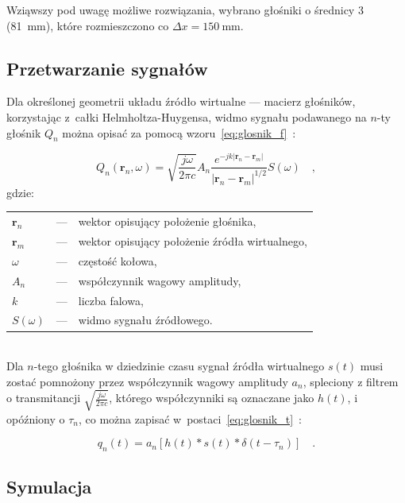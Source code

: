 \documentclass[12pt]{oska}
\let\Oldsubsection\subsection
\renewcommand{\subsection}{\FloatBarrier\Oldsubsection}
\begin{document}
Wziąwszy pod uwagę możliwe rozwiązania, wybrano głośniki o średnicy \SI{3}{\inch}
(\SI{81}{\milli\meter}), które rozmieszczono co
$\Delta x=\SI{150}{\milli\meter}$.

\subsection{Przetwarzanie sygnałów}\label{s:algorithm}

Dla określonej geometrii układu źródło wirtualne --- macierz głośników,
korzystając z~całki Helmholtza-Huygensa, widmo sygnału podawanego na $n$-ty
głośnik $Q_n$ można opisać za pomocą wzoru~\eqref{eq:glosnik_f}~\cite{delay}:

\begin{equation}
  Q_n(\bm{r}_n,\omega) = \sqrt{\frac{j\omega}{2\pi c}} A_n \frac {e^{-jk|\bm{r}_n-\bm{r}_m|}}{|\bm{r}_n-\bm{r}_m|^{1/2}} S(\omega) \quad,
  \label{eq:glosnik_f}
\end{equation}
gdzie:\\
\indent \begin{tabular}{l c p{}}
  $\bm{r}_n$ & --- & wektor opisujący położenie głośnika, \\
  $\bm{r}_m$ & --- & wektor opisujący położenie źródła wirtualnego,\\
  $\omega$ & --- & częstość kołowa, \\
  $A_n$ & --- & współczynnik wagowy amplitudy,\\
  $k$ & --- & liczba falowa,\\
  $S(\omega)$ & --- & widmo sygnału źródłowego.
\end{tabular}\\

Dla $n$-tego głośnika w dziedzinie czasu sygnał źródła wirtualnego $s(t)$  musi
zostać pomnożony przez współczynnik wagowy amplitudy $a_n$, spleciony z filtrem
o transmitancji $\sqrt{\frac{j\omega}{2\pi c}}$, którego współczynniki są
oznaczane jako $h(t)$, i opóźniony o $\tau_n$, co można zapisać
w~postaci~\eqref{eq:glosnik_t}~\cite{enhancement}:

\begin{equation}
  q_n(t) = a_n\left[h(t)*s(t)*\delta(t-\tau_n)\right] \quad. \label{eq:glosnik_t}
\end{equation}

\subsection{Symulacja}
\end{document}
